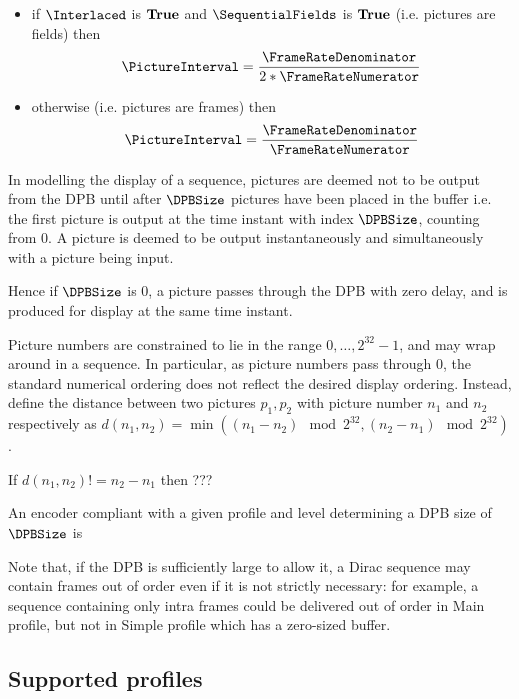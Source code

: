 \begin{itemize}
\item if $\Interlaced$ is $\text{\bf{True}}$ and $\SequentialFields$ is $\text{\bf{True}}$ (i.e. pictures are fields) then 
\begin{equation*}
\PictureInterval=\dfrac{\FrameRateDenominator}{2*\FrameRateNumerator}
\end{equation*}
\item otherwise (i.e. pictures are frames) then 
\begin{equation*}
\PictureInterval=\dfrac{\FrameRateDenominator}{\FrameRateNumerator}
\end{equation*}
\end{itemize}

In modelling the display of a sequence, pictures are deemed not to be output from the DPB until after $\DPBSize$ pictures
have been placed in the buffer i.e. the first picture is output at the time instant with index $\DPBSize$, counting from 0. 
A picture is deemed to be output instantaneously and simultaneously with a picture being input.

Hence if $\DPBSize$ is 0, a picture passes through the DPB with zero delay, and is produced for display at the same
time instant.

Picture numbers are constrained to lie in the range $0, \hdots, 2^{32}-1$, and may wrap around 
in a sequence. In particular, as picture numbers pass through 0, the standard numerical ordering does not
reflect the desired display ordering. Instead, define the distance between two pictures $p_1,p_2$ with 
picture number $n_1$
and $n_2$ respectively as $d(n_1,n_2)=\min((n_1-n_2) \mod 2^{32}, (n_2-n_1) \mod 2^{32})$. 

If $d(n_1,n_2)!=n_2-n_1$ then ???

An encoder compliant with a given profile and level determining a DPB size of $\DPBSize$ is 

\begin{informative}
Note that, if the DPB is sufficiently large to allow it, a Dirac sequence may contain frames out of order
even if it is not strictly necessary: for example, a sequence containing only intra frames could be 
delivered out of order in Main profile, but not in Simple profile which has a zero-sized buffer.
\end{informative}

\subsection{Supported profiles}